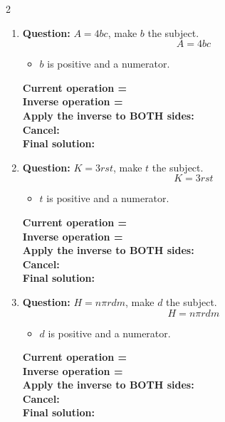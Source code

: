 \documentclass[11pt]{article}
\begin{document}
\begin{multicols}{2}
\begin{enumerate}[leftmargin=*, itemsep=10pt]
\item \textbf{Question:} \( A = 4bc \), make \( b \) the subject.
\[
A=4bc
\]
\begin{itemize}[leftmargin=*, itemsep=2pt]
\item \(b\) is positive and a numerator.
\end{itemize}
\textbf{Current operation =} \\[1cm]
\textbf{Inverse operation =} \\[1cm]
\textbf{Apply the inverse to BOTH sides:} \\[1.5cm]
\textbf{Cancel:} \\[1.5cm]
\textbf{Final solution:}\\[1.5cm]

\columnbreak
\item \textbf{Question:} \( K = 3rst \), make \( t \) the subject.
\[
K=3rst
\]
\begin{itemize}[leftmargin=*, itemsep=2pt]
\item \(t\) is positive and a numerator.
\end{itemize}
\textbf{Current operation =} \\[1cm]
\textbf{Inverse operation =} \\[1cm]
\textbf{Apply the inverse to BOTH sides:} \\[1.5cm]
\textbf{Cancel:} \\[1.5cm]
\textbf{Final solution:}\\[1.5cm]

\item \textbf{Question:} \( H = n\pi rdm \), make \( d \) the subject.
\[
H=n\pi rdm
\]
\begin{itemize}[leftmargin=*, itemsep=2pt]
\item \(d\) is positive and a numerator.
\end{itemize}
\textbf{Current operation =} \\[1cm]
\textbf{Inverse operation =} \\[1cm]
\textbf{Apply the inverse to BOTH sides:} \\[1.5cm]
\textbf{Cancel:} \\[1.5cm]
\textbf{Final solution:}\\[1.5cm]


\end{enumerate}
\end{multicols}
\end{document}
